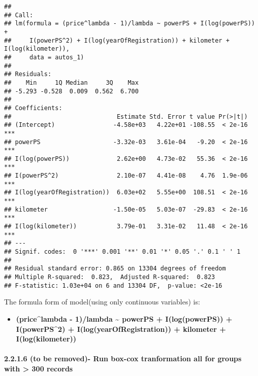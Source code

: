 \documentclass[]{article}
\newenvironment{Shaded}{\begin{snugshade}}{\end{snugshade}}
\newcommand{\CommentTok}[1]{\textcolor[rgb]{0.56,0.35,0.01}{\textit{#1}}}
\newcommand{\DecValTok}[1]{\textcolor[rgb]{0.00,0.00,0.81}{#1}}
\newcommand{\KeywordTok}[1]{\textcolor[rgb]{0.13,0.29,0.53}{\textbf{#1}}}
\newcommand{\NormalTok}[1]{#1}
\newcommand{\OperatorTok}[1]{\textcolor[rgb]{0.81,0.36,0.00}{\textbf{#1}}}
\providecommand{\tightlist}{%
  \setlength{\itemsep}{0pt}\setlength{\parskip}{0pt}}
\let\oldparagraph\paragraph
\renewcommand{\paragraph}[1]{\oldparagraph{#1}\mbox{}}
\begin{document}
\begin{verbatim}
## 
## Call:
## lm(formula = (price^lambda - 1)/lambda ~ powerPS + I(log(powerPS)) + 
##     I(powerPS^2) + I(log(yearOfRegistration)) + kilometer + I(log(kilometer)), 
##     data = autos_1)
## 
## Residuals:
##    Min     1Q Median     3Q    Max 
## -5.293 -0.528  0.009  0.562  6.700 
## 
## Coefficients:
##                             Estimate Std. Error t value Pr(>|t|)    
## (Intercept)                -4.58e+03   4.22e+01 -108.55  < 2e-16 ***
## powerPS                    -3.32e-03   3.61e-04   -9.20  < 2e-16 ***
## I(log(powerPS))             2.62e+00   4.73e-02   55.36  < 2e-16 ***
## I(powerPS^2)                2.10e-07   4.41e-08    4.76  1.9e-06 ***
## I(log(yearOfRegistration))  6.03e+02   5.55e+00  108.51  < 2e-16 ***
## kilometer                  -1.50e-05   5.03e-07  -29.83  < 2e-16 ***
## I(log(kilometer))           3.79e-01   3.31e-02   11.48  < 2e-16 ***
## ---
## Signif. codes:  0 '***' 0.001 '**' 0.01 '*' 0.05 '.' 0.1 ' ' 1
## 
## Residual standard error: 0.865 on 13304 degrees of freedom
## Multiple R-squared:  0.823,  Adjusted R-squared:  0.823 
## F-statistic: 1.03e+04 on 6 and 13304 DF,  p-value: <2e-16
\end{verbatim}

\begin{Shaded}
\end{Shaded}

The formula form of model(using only continuous variables) is:

\begin{itemize}
\tightlist
\item
  \textbf{(price\^{}lambda - 1)/lambda \textasciitilde{} powerPS +
  I(log(powerPS)) + I(powerPS\^{}2) + I(log(yearOfRegistration)) +
  kilometer + I(log(kilometer))}
\end{itemize}

\hypertarget{to-be-removed--run-box-cox-tranformation-all-for-groups-with-300-records}{%
\paragraph{2.2.1.6 (to be removed)- Run box-cox tranformation all for
groups with \textgreater{} 300
records}\label{to-be-removed--run-box-cox-tranformation-all-for-groups-with-300-records}}
\end{document}
